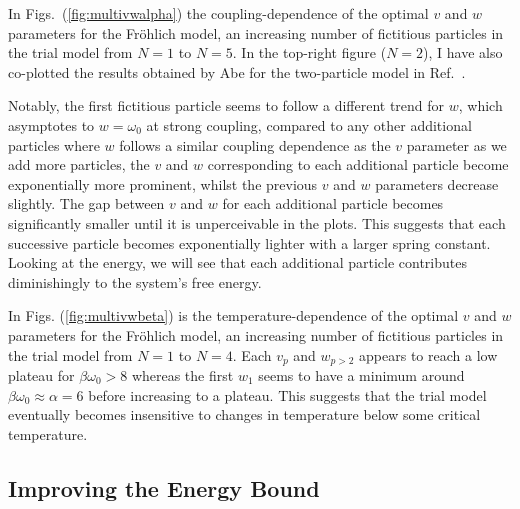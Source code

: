 In Figs.~(\ref{fig:multivwalpha}) the coupling-dependence of the optimal $v$ and $w$ parameters for the Fr\"ohlich model, an increasing number of fictitious particles in the trial model from $N=1$ to $N=5$. In the top-right figure ($N=2$), I have also co-plotted the results obtained by Abe for the two-particle model in Ref.~\cite{abe_improvement_1971}. 

Notably, the first fictitious particle seems to follow a different trend for $w$, which asymptotes to $w = \omega_0$ at strong coupling, compared to any other additional particles where $w$ follows a similar coupling dependence as the $v$ parameter as we add more particles, the $v$ and $w$ corresponding to each additional particle become exponentially more prominent, whilst the previous $v$ and $w$ parameters decrease slightly. The gap between $v$ and $w$ for each additional particle becomes significantly smaller until it is unperceivable in the plots. This suggests that each successive particle becomes exponentially lighter with a larger spring constant. Looking at the energy, we will see that each additional particle contributes diminishingly to the system's free energy.

In Figs. (\ref{fig:multivwbeta}) is the temperature-dependence of the optimal $v$ and $w$ parameters for the Fr\"ohlich model, an increasing number of fictitious particles in the trial model from $N=1$ to $N=4$. Each $v_p$ and $w_{p>2}$ appears to reach a low plateau for $\beta \omega_0 > 8$ whereas the first $w_1$ seems to have a minimum around $\beta\omega_0 \approx \alpha = 6$ before increasing to a plateau. This suggests that the trial model eventually becomes insensitive to changes in temperature below some critical temperature.

\subsection{Improving the Energy Bound}

